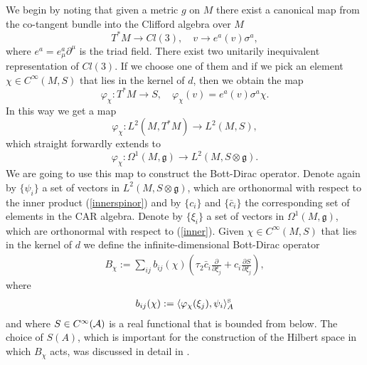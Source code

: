 \documentclass[12pt]{article}
\newcommand{\nn}{\nonumber}
\def\m{\mu}
\def\OO{\Omega}
\def\ca{{\cal A}}
\newcommand{\pa}{\partial}
\begin{document}
We begin by noting that given a metric $g$ on $M$ there exist a canonical map from the co-tangent bundle into the Clifford algebra over $M$ 
$$
T^*M\rightarrow Cl(3), \quad v\rightarrow e^a(v)\sigma^a,
$$ 
where $e^a = e^a_\m \pa^\m$ is the triad field. There exist two unitarily inequivalent representation of $Cl(3)$. If we choose one of them and if we pick an element $\chi \in C^\infty(M,S)$ that lies in the kernel of $d$, then we obtain the map
\begin{equation}
\varphi_\chi: T^*M \rightarrow S,\quad \varphi_\chi(v) = e^a(v)\sigma^a \chi .
\end{equation}
In this way we get a map
$$
\varphi_\chi: L^2(M, T^*M)\rightarrow L^2(M,S),
$$
which straight forwardly extends to
$$
\varphi_\chi: \OO^1(M,\mathfrak{g})\rightarrow L^2(M,S\otimes\mathfrak{g}).
$$
We are going to use this map to construct the Bott-Dirac operator.
Denote again by $\{{\psi}_i\}$ a set of vectors in $L^2(M,S\otimes \mathfrak{g})$, which are orthonormal with respect to the inner product (\ref{innerspinor}) and by $\{c_i\}$ and $\{ \bar{c}_i \}$ the corresponding set of elements in the CAR algebra. Denote by $\{\xi_i\}$ a set of vectors in $\OO^1(M,\mathfrak{g})$, which are orthonormal with respect to (\ref{inner}).  
Given  $\chi \in C^\infty(M,S)$ that lies in the kernel of $d$ we define the infinite-dimensional Bott-Dirac operator
\begin{eqnarray}
B_\chi %
:=  \sum_{ij} b_{ij}(\chi)  \left(  \tau_2  \bar{c}_i      \frac{\pa}{\pa\xi_{j }} +    {c}_{i} \frac{\pa S}{\pa \xi_j}\right),
\label{F1}
\end{eqnarray}
where
\begin{eqnarray}
b_{ij} (\chi) :=  \langle {\varphi}_\chi(\xi_j), \psi_i \rangle_{A}^{\mbox{\tiny S}}
\label{b}
\end{eqnarray}
and where $S\in C^\infty(\ca)$ is a real functional that is bounded from below. The choice of $S(A)$, which is important for the construction of the Hilbert space in which $B_\chi$ acts, was discussed in detail in \cite{Aastrup:2019yui}. 
\end{document}

